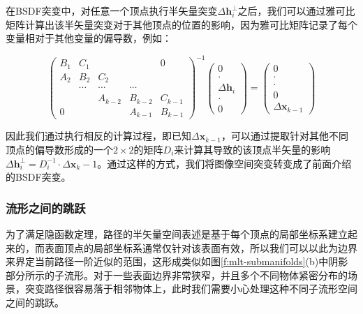 在BSDF突变中，对任意一个顶点执行半矢量突变$\Delta\mathbf{h}^{\perp}_i$之后，我们可以通过雅可比矩阵计算出该半矢量突变对于其他顶点的位置的影响，因为雅可比矩阵记录了每个变量相对于其他变量的偏导数，例如：

\begin{equation}
	\begin{pmatrix}
		B_1 & C_1    &         &         & 0\\
		A_2 & B_2    &  C_2    &         &  \\
		    & \cdots & \cdots  & \cdots  &  \\
		    &        & A_{k-2} & B_{k-2} & C_{k-1}\\
		0   &        &         & A_{k-1} & B_{k-1}
	\end{pmatrix}^{-1}\begin{pmatrix}
		0\\
		\cdot\\
		\Delta\mathbf{h}_i\\
		\cdot\\
		0
	\end{pmatrix}=\begin{pmatrix}
		0\\
		\cdot\\
		\cdot\\
		0\\
		\Delta\mathbf{x}_{k-1}
	\end{pmatrix}
\end{equation}

因此我们通过执行相反的计算过程，即已知$\Delta\mathbf{x}_{k-1}$，可以通过提取针对其他不同顶点的偏导数形成的一个$2\times 2$的矩阵$D_i$来计算其导致的该顶点半矢量的影响$\Delta\mathbf{h}^{\perp}_i=D^{-1}_i\cdot\Delta\mathbf{x}_k-1$。通过这样的方式，我们将图像空间突变转变成了前面介绍的BSDF突变。






\subsubsection{流形之间的跳跃}
为了满足隐函数定理\cite{b:CalculusonManifolds:AModernApproachtoClassicalTheoremsofAdvancedCalculus}，路径的半矢量空间表述是基于每个顶点的局部坐标系建立起来的，而表面顶点的局部坐标系通常仅针对该表面有效，所以我们可以以此为边界来界定当前路径一阶近似的范围，这形成类似如图\ref{f:mlt-submanifolds}(b)中阴影部分所示的子流形。对于一些表面边界非常狭窄，并且多个不同物体紧密分布的场景，突变路径很容易落于相邻物体上，此时我们需要小心处理这种不同子流形空间之间的跳跃。

